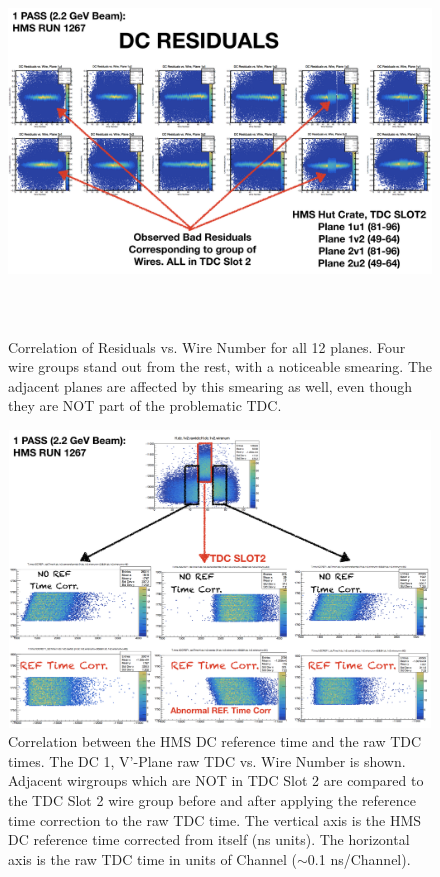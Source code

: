 \documentclass[11pt]{article}
\begin{document}
\begin{figure}[h!]
  \centering
  \includegraphics[width=7.0in, height=4.0in]{bad_wireresidual.png}
  \caption{Correlation of Residuals vs. Wire Number for all 12 planes. Four wire groups stand out from the rest, with a noticeable smearing.
  The adjacent planes are affected by this smearing as well, even though they are NOT part of the problematic TDC.}
  \label{fig:wire_residual}
\end{figure}
\begin{figure}[h!]
  \centering
  \includegraphics[width=5.1in, height=3.1in]{hDC_RefTime_correlation.png}
  \caption{Correlation between the HMS DC reference time and the raw TDC times. The DC 1, V'-Plane raw TDC vs. Wire Number is shown. Adjacent wirgroups which
    are NOT in TDC Slot 2 are compared to the TDC Slot 2 wire group before and after applying the reference time correction to the raw TDC time. The vertical axis
  is the HMS DC reference time corrected from itself (ns units). The horizontal axis is the raw TDC time in units of Channel ($\sim$0.1 ns/Channel).}
  \label{fig:hDC_correlation}
\end{figure}
\end{document}
